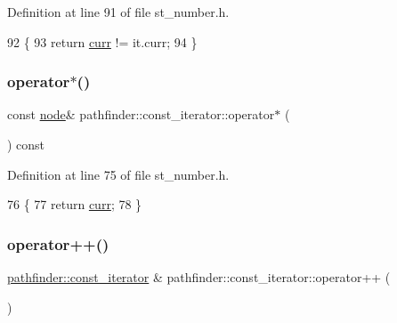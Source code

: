 Definition at line 91 of file st\+\_\+number.\+h.


\begin{DoxyCode}
92     \{
93         \textcolor{keywordflow}{return} \mbox{\hyperlink{classpathfinder_1_1const__iterator_a76b08ac8c5b5055b95cc37d5a14d54e4}{curr}} != it.curr;
94     \}
\end{DoxyCode}
\mbox{\label{classpathfinder_1_1const__iterator_a71d37d3c7f9e5301eaa5fe995877613a}} 
\subsubsection{\texorpdfstring{operator$\ast$()}{operator*()}}
{\footnotesize\ttfamily const \mbox{\hyperlink{classnode}{node}}\& pathfinder\+::const\+\_\+iterator\+::operator$\ast$ (\begin{DoxyParamCaption}{ }\end{DoxyParamCaption}) const\hspace{0.3cm}{\ttfamily [inline]}}



Definition at line 75 of file st\+\_\+number.\+h.


\begin{DoxyCode}
76     \{
77         \textcolor{keywordflow}{return} \mbox{\hyperlink{classpathfinder_1_1const__iterator_a76b08ac8c5b5055b95cc37d5a14d54e4}{curr}};
78     \}
\end{DoxyCode}
\mbox{\label{classpathfinder_1_1const__iterator_acc71bfba7f3318446d97cf058871b015}} 
\subsubsection{\texorpdfstring{operator++()}{operator++()}\hspace{0.1cm}{\footnotesize\ttfamily [1/2]}}
{\footnotesize\ttfamily \mbox{\hyperlink{classpathfinder_1_1const__iterator}{pathfinder\+::const\+\_\+iterator}} \& pathfinder\+::const\+\_\+iterator\+::operator++ (\begin{DoxyParamCaption}{ }\end{DoxyParamCaption})}



